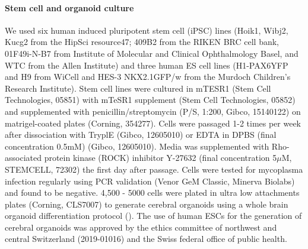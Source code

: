  
\paragraph{Stem cell and organoid culture}
We used six human induced pluripotent stem cell (iPSC) lines (Hoik1, Wibj2, Kucg2 from the HipSci resource47; 409B2 from the RIKEN BRC cell bank, 01F49i-N-B7 from Institute of Molecular and Clinical Ophthalmology Basel, and WTC from the Allen Institute) and three human ES cell lines (H1-PAX6YFP and H9 from WiCell and HES-3 NKX2.1GFP/w from the Murdoch Children's Research Institute). Stem cell lines were cultured in mTESR1 (Stem Cell Technologies, 05851) with mTeSR1 supplement (Stem Cell Technologies, 05852) and supplemented with penicillin/streptomycin (P/S, 1:200, Gibco, 15140122) on matrigel-coated plates (Corning, 354277). Cells were passaged 1-2 times per week after dissociation with TryplE (Gibco, 12605010) or EDTA in DPBS (final concentration 0.5mM) (Gibco, 12605010). Media was supplemented with Rho-associated protein kinase (ROCK) inhibitor Y-27632 (final concentration 5$\mu$M, STEMCELL, 72302) the first day after passage. Cells were tested for mycoplasma infection regularly using PCR validation (Venor GeM Classic, Minerva Biolabs) and found to be negative. 4,500 - 5000 cells were plated in ultra low attachments plates (Corning, CLS7007) to generate cerebral organoids using a whole brain organoid differentiation protocol (\cite{lancaster_cerebral_2013}). The use of human ESCs for the generation of cerebral organoids was approved by the ethics committee of northwest and central Switzerland (2019-01016) and the Swiss federal office of public health.


